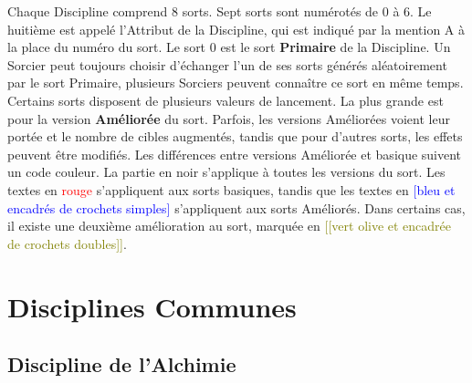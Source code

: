 \documentclass[a4paper,8pt]{extarticle}
\newcommand{\amel}[1]{\textcolor{blue}{[#1]}}
\newcommand{\base}{\textcolor{red}}
\newcommand{\amelbis}[1]{\textcolor{olive}{[[#1]]}}
\newcommand{\newrule}{\textcolor{green!50!black}}
\begin{document}
{Chaque Discipline comprend 8 sorts. Sept sorts sont numérotés de 0 à 6. Le huitième est appelé l’Attribut de la Discipline, qui est indiqué par la mention \og A \fg{} à la place du numéro du sort. Le sort 0 est le sort \textbf{Primaire} de la Discipline. Un Sorcier peut toujours choisir d'échanger l'un de ses sorts générés aléatoirement par le sort Primaire, plusieurs Sorciers peuvent connaître ce sort en même temps. Certains sorts disposent de plusieurs valeurs de lancement. La plus grande est pour la version \textbf{Améliorée} du sort. Parfois, les versions Améliorées voient leur portée et le nombre de cibles augmentés, tandis que pour d'autres sorts, les effets peuvent être modifiés. Les différences entre versions Améliorée et basique suivent un code couleur. La partie en noir s'applique à toutes les versions du sort. Les textes en \base{rouge} s'appliquent aux sorts basiques, tandis que les textes en \amel{bleu et encadrés de crochets simples} s'appliquent aux sorts Améliorés. Dans certains cas, il existe une deuxième amélioration au sort, marquée en \amelbis{vert olive et encadrée de crochets doubles}. 

}
\clearpage

\section{Disciplines Communes}

\subsection{Discipline de l'Alchimie}
\end{document}
